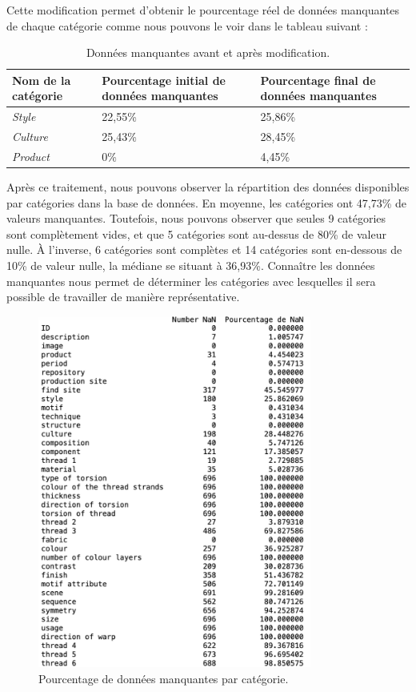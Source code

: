 Cette modification permet d'obtenir le pourcentage réel de données manquantes de chaque catégorie comme nous pouvons le voir dans le tableau suivant : \\

\begin{table}[!h]
    \begin{tabular}{|p{}|p{}|p{}|}
        \hline
        \textbf{Nom de la catégorie} & \textbf{Pourcentage initial de données manquantes} & \textbf{Pourcentage final de données manquantes } \\ [3ex]\hline
         \textit{Style} & 22,55\% & 25,86\%\\[1ex] \hline
           \textit{Culture}& 25,43\% & 28,45\% \\ [1ex]\hline
           \textit{Product}& 0\% & 4,45\% \\ [1ex]\hline
    \end{tabular}
    \caption{Données manquantes avant et après modification.}
    \label{tab:NaN}
\end{table}  

Après ce traitement, nous pouvons observer la répartition des données disponibles par catégories dans la base de données. En moyenne, les catégories ont 47,73\% de valeurs manquantes. Toutefois, nous pouvons observer que seules 9 catégories sont complètement vides, et que 5 catégories sont au-dessus de 80\% de valeur nulle. À l'inverse, 6 catégories sont complètes et 14 catégories sont en-dessous de 10\% de valeur nulle, la médiane se situant à 36,93\%. Connaître les données manquantes nous permet de déterminer les catégories avec lesquelles il sera possible de travailler de manière représentative.

\begin{figure}[!h]
	\begin{center}
		\includegraphics[width=9cm]{../images/NaN.png}
           	 \caption{Pourcentage de données manquantes par catégorie.}
           	 \label{NaN}
	 \end{center}
  \end{figure}



